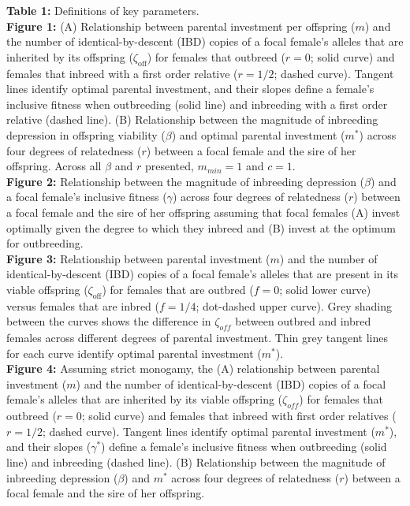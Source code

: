 \documentclass[12pt]{article}
\begin{document}



\clearpage

\noindent \textbf{Table 1:}  Definitions of key parameters. \\

\noindent \textbf{Figure 1:} (A) Relationship between parental investment per offspring ($m$) and the number of identical-by-descent {\color{blue}(IBD)} copies of a focal female's alleles that are inherited by its offspring ($\zeta_{\textrm{off}}$) for females that outbreed ({\color{blue}$r=0$}; solid curve) and females that inbreed with a first order relative ({\color{blue}$r=1/2$}; dashed curve). Tangent lines identify optimal parental investment, and their slopes define a female's inclusive fitness when outbreeding (solid line) and inbreeding with a first order relative (dashed line). (B) Relationship between the magnitude of inbreeding depression in offspring viability ($\beta$) and optimal parental investment ($m^{*}$) across four degrees of relatedness ($r$) between a focal female and the sire of her offspring. Across all $\beta$ and $r$ presented, $m_{min}=1$ and $c=1$. \\

\noindent \textbf{Figure 2:} Relationship between the magnitude of inbreeding depression ($\beta$) and a focal female's inclusive fitness ($\gamma$) across four degrees of relatedness ($r$) between a focal female and the sire of her offspring assuming that focal females (A) invest optimally given the degree to which they inbreed and (B) invest at the optimum for outbreeding. \\

\noindent \textbf{Figure 3:} Relationship between parental investment ($m$) and the number of identical-by-descent {\color{blue}(IBD)} copies of a focal female's alleles that are present in its viable offspring ($\zeta_{\textrm{off}}$) for females that are outbred ($f=0$; solid lower curve) versus females that are inbred ($f=1/4$; dot-dashed upper curve). Grey shading between the curves shows the difference in $\zeta_{off}$ between outbred and inbred females across different degrees of parental investment. Thin grey tangent lines for each curve identify optimal parental investment ($m^{*}$). \\

\noindent \textbf{Figure 4:} Assuming strict monogamy, the (A) relationship between parental investment ($m$) and the number of identical-by-descent {\color{blue}(IBD)} copies of a focal female's alleles that are inherited by its viable offspring ($\zeta_{off}$) for females that outbreed ($r=0$; solid curve) and females that inbreed with first order relatives ($r=1/2$; dashed curve). Tangent lines identify optimal parental investment ($m^{*}$), and their slopes ($\gamma^{*}$) define a female's inclusive fitness when outbreeding (solid line) and inbreeding (dashed line). (B) Relationship between the magnitude of inbreeding depression ($\beta$) and $m^{*}$ across four degrees of relatedness ($r$) between a focal female and the sire of her offspring. \\
\end{document}

